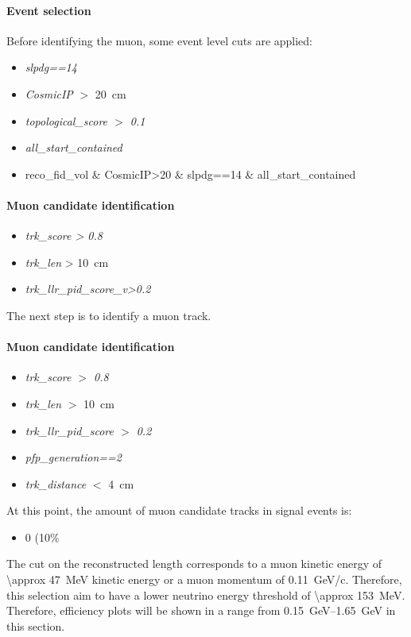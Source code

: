 \paragraph{Event selection}
Before identifying the muon, some event level cuts are applied:

\begin{itemize}
    \item \textit{slpdg==14}
    \item \textit{CosmicIP} $>$ \SI{20}{\cm}
    \item \textit{topological\_score $>$ 0.1}
    \item \textit{all\_start\_contained}
    \item reco\_fid\_vol \& CosmicIP>20 \& slpdg==14 \& all\_start\_contained
\end{itemize} 

\paragraph{Muon candidate identification} 
\begin{itemize}
    \item \textit{trk\_score > 0.8}
    \item \textit{trk\_len} > \SI{10}{\cm}
    \item \textit{trk\_llr\_pid\_score\_v>0.2}
\end{itemize}
The next step is to identify a muon track.
\paragraph{Muon candidate identification} 
\begin{itemize}
    \item \textit{trk\_score $>$ 0.8}
    \item \textit{trk\_len} $>$ \SI{10}{\cm}
    \item \textit{trk\_llr\_pid\_score $>$ 0.2}
    \item \textit{pfp\_generation==2}
    \item \textit{trk\_distance} $<$ \SI{4}{\cm}
\end{itemize}
At this point, the amount of muon candidate tracks in signal events is:
\begin{itemize}
    \item 0 (10\%
\end{itemize}



The cut on the reconstructed length corresponds to a muon kinetic energy of \SI{\approx 47}{\MeV} kinetic energy or a muon momentum of \SI{0.11}{GeV/c}. Therefore, this selection aim to have a lower neutrino energy threshold of \SI{\approx 153}{\MeV}. Therefore, efficiency plots will be shown in a range from \SIrange{0.15}{1.65}{\GeV} in this section.



